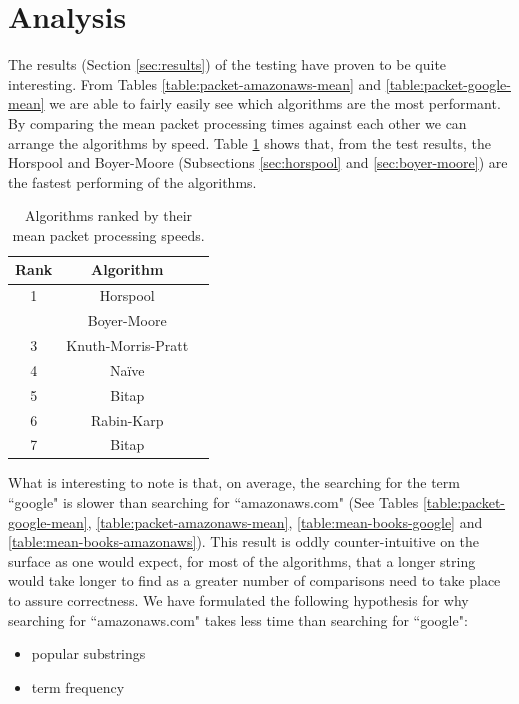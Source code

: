 \documentclass{article}
\begin{document}
\section{Analysis}

The results (Section \ref{sec:results}) of the testing have proven to be quite interesting. From Tables \ref{table:packet-amazonaws-mean} and \ref{table:packet-google-mean} we are able to fairly easily see which algorithms are the most performant. By comparing the mean packet processing times against each other we can arrange the algorithms by speed. Table \ref{table:ranked-mean-packet-processing-time} shows that, from the test results, the Horspool and Boyer-Moore (Subsections \ref{sec:horspool} and \ref{sec:boyer-moore}) are the fastest performing of the algorithms.

\begin{table}[h!bt]
  \centering
  \begin{tabular}{c|cc}
    Rank & Algorithm\\
    \hline
    1 & Horspool \\
      & Boyer-Moore \\
    3 & Knuth-Morris-Pratt \\
    4 & Na{\"i}ve \\
    5 & Bitap \\
    6 & Rabin-Karp \\
    7 & Bitap 
  \end{tabular}
  \caption{Algorithms ranked by their mean packet processing speeds.}
  \label{table:ranked-mean-packet-processing-time}
\end{table}

What is interesting to note is that, on average, the searching for the term ``google" is slower than searching for ``amazonaws.com" (See Tables \ref{table:packet-google-mean}, \ref{table:packet-amazonaws-mean}, \ref{table:mean-books-google} and \ref{table:mean-books-amazonaws}). This result is oddly counter-intuitive on the surface as one would expect, for most of the algorithms, that a longer string would take longer to find as a greater number of comparisons need to take place to assure correctness. We have formulated the following hypothesis for why searching for ``amazonaws.com" takes less time than searching for ``google":
\begin{itemize}
  \item popular substrings
  \item term frequency
\end{itemize}
\end{document}
